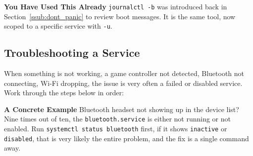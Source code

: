 \documentclass{article}
\newcommand{\code}[1]{\colorbox{codebg}{\texttt{#1}}}
\begin{document}
\begin{callout}{\textbf{You Have Used This Already}}
	\code{journalctl -b} was introduced back in Section~\ref{ssub:dont_panic} to
	review boot messages. It is the same tool, now scoped to a specific
	service with \code{-u}.
\end{callout}

\subsection{Troubleshooting a Service}

When something is not working, a game controller not detected, Bluetooth not
connecting, Wi-Fi dropping, the issue is very often a failed or disabled
service. Work through the steps below in order:

\begin{callout}{\textbf{A Concrete Example}}
	Bluetooth headset not showing up in the device list? Nine times out of ten,
	the \code{bluetooth.service} is either not running or not enabled. Run
	\code{systemctl status bluetooth} first, if it shows \code{inactive} or
	\code{disabled}, that is very likely the entire problem, and the fix is a
	single command away.
\end{callout}

\vspace{1em}
\end{document}
